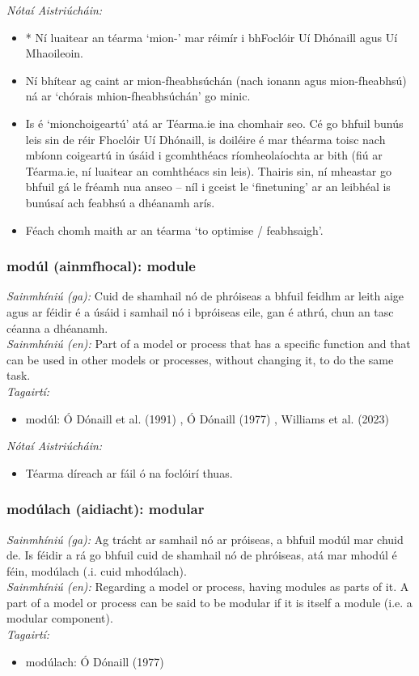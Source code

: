 \documentclass{article}
\begin{document}
 \noindent \textit{Nótaí Aistriúcháin:}
\begin{itemize}
	\item * Ní luaitear an téarma `mion-' mar réimír i bhFoclóir Uí Dhónaill agus Uí Mhaoileoin.
	\item Ní bhítear ag caint ar mion-fheabhsúchán (nach ionann agus mion-fheabhsú) ná ar `chórais mhion-fheabhsúchán' go minic.
	\item Is é `mionchoigeartú' atá ar Téarma.ie ina chomhair seo. Cé go bhfuil bunús leis sin de réir Fhoclóir Uí Dhónaill, is doiléire é mar théarma toisc nach mbíonn coigeartú in úsáid i gcomhthéacs ríomheolaíochta ar bith (fiú ar Téarma.ie, ní luaitear an comhthéacs sin leis). Thairis sin, ní mheastar go bhfuil gá le fréamh nua anseo -- níl i gceist le `finetuning' ar an leibhéal is bunúsaí ach feabhsú a dhéanamh arís.
	\item Féach chomh maith ar an téarma `to optimise / feabhsaigh'.
\end{itemize}


\subsubsection*{modúl (ainmfhocal): module}
 \noindent \textit{Sainmhíniú (ga):} Cuid de shamhail nó de phróiseas a bhfuil feidhm ar leith aige agus ar féidir é a úsáid i samhail nó i bpróiseas eile, gan é athrú, chun an tasc céanna a dhéanamh.
\\
 \noindent \textit{Sainmhíniú (en):} Part of a model or process that has a specific function and that can be used in other models or processes, without changing it, to do the same task.
\\
 \noindent \textit{Tagairtí:}
\begin{itemize}
	\item modúl: Ó Dónaill et al. (1991) \cite{focloir-beag}, Ó Dónaill (1977) \cite{odonaill}, Williams et al. (2023) \cite{storchiste}
\end{itemize}

 \noindent \textit{Nótaí Aistriúcháin:}
\begin{itemize}
	\item Téarma díreach ar fáil ó na foclóirí thuas.
\end{itemize}


\subsubsection*{modúlach (aidiacht): modular}
 \noindent \textit{Sainmhíniú (ga):} Ag trácht ar samhail nó ar próiseas, a bhfuil modúl mar chuid de. Is féidir a rá go bhfuil cuid de shamhail nó de phróiseas, atá mar mhodúl é féin, modúlach (.i. cuid mhodúlach).
\\
 \noindent \textit{Sainmhíniú (en):} Regarding a model or process, having modules as parts of it. A part of a model or process can be said to be modular if it is itself a module (i.e. a modular component).
\\
 \noindent \textit{Tagairtí:}
\begin{itemize}
	\item modúlach: Ó Dónaill (1977) \cite{odonaill}
\end{itemize}
\end{document}

